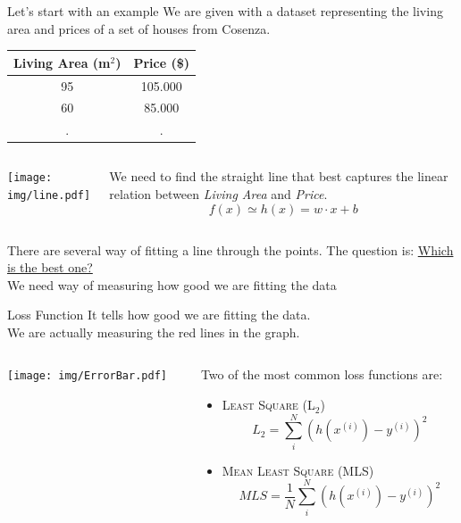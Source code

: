 \documentclass{beamer}
\newcommand{\sample}[2]{#1^{(#2)}}
\begin{document}
\begin{frame}{Let's start with an example}
\small
We are given with a dataset representing the living area and prices
of a set of houses from Cosenza.

\begin{table}
\centering
\begin{tabular}{c|c}
Living Area (m$^2$) & Price (\$) \\ 
\hline
95 & 105.000 \\
60 & 85.000 \\
 . & . \\
\end{tabular}
\end{table}
\begin{columns}
\begin{column}{0.5\textwidth}
\texttt{[image: img/line.pdf]}

\end{column}
\begin{column}{0.5\textwidth}
We need to find the straight line that best captures
the linear relation between \textit{Living Area} and \textit{Price}.
\[
	f(x) \simeq h(x) = w \cdot x + b
\]

\end{column}
\end{columns}
\pause
There are several way of fitting a line through the points.
The question is: \underline{Which is the best one?}\\
\pause
We need  way of measuring how good we are fitting the data
\end{frame}


\begin{frame}{Loss Function}
It tells how good we are fitting the data. \\
We are actually measuring the red lines in the graph.
\vskip 1cm
\begin{columns}
\begin{column}{0.5\textwidth}
\texttt{[image: img/ErrorBar.pdf]}
\end{column}
\begin{column}{0.5\textwidth}
Two of the most common loss functions are:
\begin{itemize}
\item \textsc{Least Square (L$_2$)}
		\[
        	L_2 = \sum_{i}^{N} (h(\sample{x}{i}) - \sample{y}{i})^2
        \]
\item \textsc{Mean Least Square (MLS)}
		\[
        	MLS = \frac{1}{N} \sum_{i}^{N} (h(\sample{x}{i}) - \sample{y}{i})^2
        \]
\end{itemize}
\end{column}
\end{columns}
\end{frame}
\end{document}
